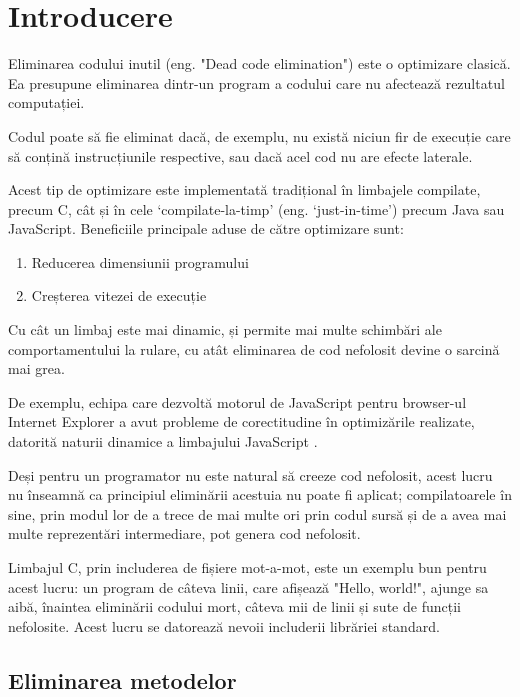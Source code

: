 \chapter{Introducere}

Eliminarea codului inutil (eng. "Dead code elimination")
\cite{wiki:deadcodeelimination} este o optimizare clasică.  Ea
presupune eliminarea dintr-un program a codului care nu afectează
rezultatul computației.

Codul poate să fie eliminat dacă, de exemplu, nu există niciun fir
de execuție care să conțină instrucțiunile respective, sau dacă
acel cod nu are efecte laterale.

Acest tip de optimizare este implementată tradițional în
limbajele compilate, precum C, cât și în cele `compilate-la-timp'
(eng. `just-in-time') precum Java sau JavaScript.  Beneficiile
principale aduse de către optimizare sunt:

\begin{enumerate}
	\item Reducerea dimensiunii programului
	\item Creșterea vitezei de execuție
\end{enumerate}

Cu cât un limbaj este mai dinamic, și permite mai multe schimbări ale
comportamentului la rulare, cu atât eliminarea de cod nefolosit
devine o sarcină mai grea.

De exemplu, echipa care dezvoltă motorul de JavaScript pentru
browser-ul Internet Explorer a avut probleme de corectitudine în
optimizările realizate, datorită naturii dinamice a limbajului
JavaScript \cite{deadcodeeliminationforbeginners}.

Deși pentru un programator nu este natural să creeze cod
nefolosit, acest lucru nu înseamnă ca principiul eliminării
acestuia nu poate fi aplicat; compilatoarele în sine, prin modul
lor de a trece de mai multe ori prin codul sursă și de a avea mai
multe reprezentări intermediare, pot genera cod nefolosit.

Limbajul C, prin includerea de fișiere mot-a-mot, este un exemplu
bun pentru acest lucru: un program de câteva linii, care afișează
"Hello, world!", ajunge sa aibă, înaintea eliminării codului mort,
câteva mii de linii și sute de funcții nefolosite. Acest lucru se datorează
nevoii includerii librăriei standard.

\section{Eliminarea metodelor}

